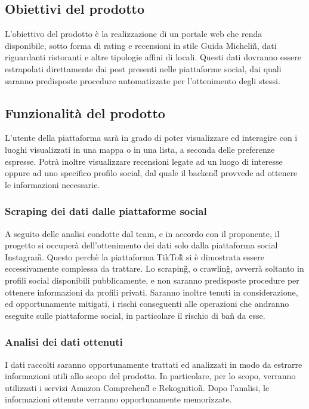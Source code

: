 \subsection{Obiettivi del prodotto}
L'obiettivo del prodotto è la realizzazione di un portale web che renda disponibile, sotto forma di rating e recensioni in stile Guida Michelin\G{}, dati riguardanti 
ristoranti e altre tipologie affini di locali. 
Questi dati dovranno essere estrapolati direttamente dai post presenti nelle piattaforme social, dai quali saranno predisposte procedure automatizzate per l'ottenimento degli stessi.

\subsection{Funzionalità del prodotto}
L'utente della piattaforma sarà in grado di poter visualizzare ed interagire con i luoghi visualizzati in una mappa o in una lista, a seconda delle preferenze espresse.
Potrà inoltre visualizzare recensioni legate ad un luogo di interesse oppure ad uno specifico profilo social, dal quale il backend\G{} provvede ad ottenere le informazioni necessarie.

\subsubsection{Scraping dei dati dalle piattaforme social}
A seguito delle analisi condotte dal team, e in accordo con il proponente, il progetto si occuperà dell'ottenimento dei dati solo dalla piattaforma social Instagram\G{}. Questo perchè la piattaforma TikTok\G{} si è dimostrata essere eccessivamente complessa da trattare.
Lo scraping\G{}, o crawling\G{}, avverrà soltanto in profili social disponibili pubblicamente, e non saranno predisposte procedure per ottenere informazioni da profili privati.
Saranno inoltre tenuti in considerazione, ed opportunamente mitigati, i rischi conseguenti alle operazioni che andranno eseguite sulle piattaforme social, in particolare il rischio di ban\G{} da esse.

\subsubsection{Analisi dei dati ottenuti}
I dati raccolti saranno opportunamente trattati ed analizzati in modo da estrarre informazioni utili allo scopo del prodotto. 
In particolare, per lo scopo, verranno utilizzati i servizi Amazon Comprehend\G{} e Rekognition\G{}.
Dopo l'analisi, le informazioni ottenute verranno opportunamente memorizzate.

